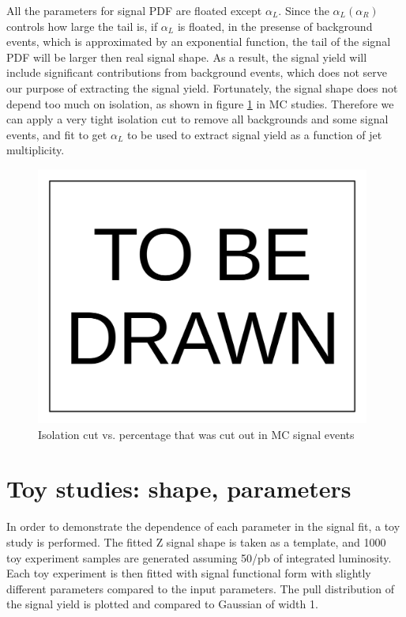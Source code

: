 \documentclass[10pt,a4paper,onecolumn]{	article}
\begin{document}
All the parameters for signal PDF are floated except $\alpha_L$.  Since the $\alpha_L (\alpha_R)$ controls how large the tail is, if $\alpha_L$ is floated,
in the presense of background events, which is approximated by an exponential function, the tail of the signal PDF will be larger then real signal shape.
As a result, the signal yield will include significant contributions from background events, which does not serve our purpose of extracting the signal yield.
Fortunately, the signal shape does not depend too much on isolation, as shown in figure \ref{Figure_SignalShapeVsIsolation} in MC studies.
Therefore we can apply a very tight isolation cut to remove all backgrounds and some signal events, and fit to get $\alpha_L$ to be used to extract signal yield
as a function of jet multiplicity.

\begin{figure}
\includegraphics[width=110mm]{ToBeDrawn.pdf}
\caption{Isolation cut vs. percentage that was cut out in MC signal events}
\label{Figure_SignalShapeVsIsolation}
\end{figure}



\section{Toy studies: shape, parameters}

In order to demonstrate the dependence of each parameter in the signal fit, a toy study is performed.
The fitted Z signal shape is taken as a template, and 1000 toy experiment samples are generated assuming 50/pb of integrated luminosity.
Each toy experiment is then fitted with signal functional form with slightly different parameters compared to the input parameters.
The pull distribution of the signal yield is plotted and compared to Gaussian of width 1.
\end{document}

